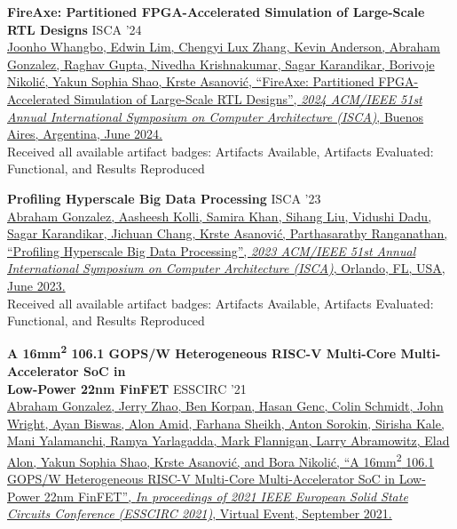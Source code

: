 \documentclass[line]{res}
\begin{document}
\begin{resume}
\textbf{FireAxe: Partitioned FPGA-Accelerated Simulation of Large-Scale RTL Designs} \hfill ISCA '24
\vspace{0.7mm}
\\
\href{https://ieeexplore.ieee.org/document/10609699}{Joonho Whangbo, Edwin Lim, Chengyi Lux Zhang, Kevin Anderson, \underline{Abraham Gonzalez}, Raghav Gupta, Nivedha Krishnakumar, Sagar Karandikar, Borivoje Nikoli\'c, Yakun Sophia Shao, Krste Asanovi\'c, ``FireAxe: Partitioned FPGA-Accelerated Simulation of Large-Scale RTL Designs'', \textit{2024 ACM/IEEE 51st Annual International Symposium on Computer Architecture (ISCA)}, Buenos Aires, Argentina, June 2024.}
\\
Received all available artifact badges: Artifacts Available, Artifacts Evaluated: Functional, and Results Reproduced
\vspace{-1mm}

\label{sec:iscapaper}
\textbf{Profiling Hyperscale Big Data Processing} \hfill ISCA '23
\vspace{0.7mm}
\\
\href{https://dl.acm.org/doi/10.1145/3579371.3589082}{\underline{Abraham Gonzalez}, Aasheesh Kolli, Samira Khan, Sihang Liu, Vidushi Dadu, Sagar Karandikar, Jichuan Chang, Krste Asanovi\'c, Parthasarathy Ranganathan, ``Profiling Hyperscale Big Data Processing'', \textit{2023 ACM/IEEE 51st Annual International Symposium on Computer Architecture (ISCA)}, Orlando, FL, USA, June 2023.}
\\
Received all available artifact badges: Artifacts Available, Artifacts Evaluated: Functional, and Results Reproduced
\vspace{-1mm}

\label{sec:beaglepaper}
\textbf{A 16mm\textsuperscript{2} 106.1 GOPS/W Heterogeneous RISC-V Multi-Core Multi-Accelerator SoC in\\Low-Power 22nm FinFET} \hfill ESSCIRC '21
\vspace{0.7mm}
\\
\href{https://ieeexplore.ieee.org/abstract/document/9567768}{\underline{Abraham Gonzalez}, Jerry Zhao, Ben Korpan, Hasan Genc, Colin Schmidt, John Wright, Ayan Biswas, Alon Amid, Farhana Sheikh, Anton Sorokin, Sirisha Kale, Mani Yalamanchi, Ramya Yarlagadda, Mark Flannigan, Larry Abramowitz, Elad Alon, Yakun Sophia Shao, Krste Asanovi\'c, and Bora Nikoli\'c, ``A 16mm\textsuperscript{2} 106.1 GOPS/W Heterogeneous RISC-V Multi-Core Multi-Accelerator SoC in Low-Power 22nm FinFET'', \textit{In proceedings of 2021 IEEE European Solid State Circuits Conference (ESSCIRC 2021)}, Virtual Event, September 2021.}
\vspace{-1mm}


\end{resume}
\end{document}
